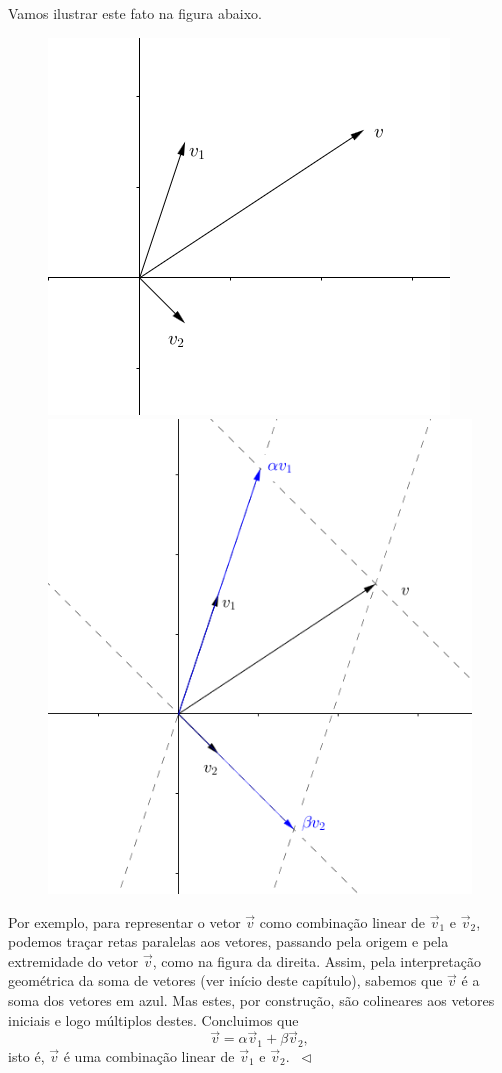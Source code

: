 \begin{ex}
Vamos ilustrar este fato na figura abaixo.
\begin{figure}[h!]
\begin{center}
\includegraphics[width=0.4\linewidth]{Semana02/semana02-comblinear1}
\includegraphics[width=0.4\linewidth]{Semana02/semana02-comblinear3}
\end{center}
\end{figure}
Por exemplo, para representar o vetor $\vec{v}$ como combinação linear de $\vec{v}_1$ e $\vec{v}_2$, podemos traçar retas paralelas aos vetores, passando pela origem e pela extremidade do vetor $\vec{v}$, como na figura da direita. Assim, pela interpretação geométrica da soma de vetores (ver início deste capítulo), sabemos que $\vec{v}$ é a soma dos vetores em azul. Mas estes, por construção, são colineares aos vetores iniciais e logo múltiplos destes. Concluimos que
\begin{equation}
\vec{v} = \alpha \vec{v}_1 + \beta \vec{v}_2,
\end{equation} isto é, $\vec{v}$ é uma combinação linear de $\vec{v}_1$ e $\vec{v}_2$. $\ \lhd$
\end{ex}




